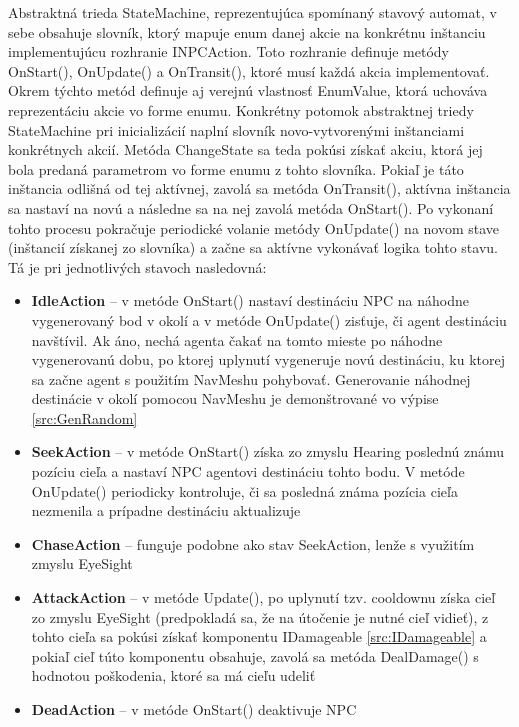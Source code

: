 \documentclass[slovak, master]{diploma}
\begin{document}
Abstraktná trieda StateMachine, reprezentujúca spomínaný stavový automat, v sebe obsahuje slovník, ktorý mapuje enum danej akcie na konkrétnu inštanciu implementujúcu rozhranie INPCAction. Toto rozhranie definuje metódy OnStart(), OnUpdate() a OnTransit(), ktoré musí každá akcia implementovať. Okrem týchto metód definuje aj verejnú vlastnosť EnumValue, ktorá uchováva reprezentáciu akcie vo forme enumu. Konkrétny potomok abstraktnej triedy StateMachine pri inicializácií naplní slovník novo-vytvorenými inštanciami konkrétnych akcií. Metóda ChangeState sa teda pokúsi získať akciu, ktorá jej bola predaná parametrom vo forme enumu z tohto slovníka. Pokiaľ je táto inštancia odlišná od tej aktívnej, zavolá sa metóda OnTransit(), aktívna inštancia sa nastaví na novú a následne sa na nej zavolá metóda OnStart(). Po vykonaní tohto procesu pokračuje periodické volanie metódy OnUpdate() na novom stave (inštancií získanej zo slovníka) a začne sa aktívne vykonávať logika tohto stavu. Tá je pri jednotlivých stavoch nasledovná:
\begin{itemize}
  \item \textbf{IdleAction} -- v metóde OnStart() nastaví destináciu NPC na náhodne vygenerovaný bod v okolí a v metóde OnUpdate() zisťuje, či agent destináciu navštívil. Ak áno, nechá agenta čakať na tomto mieste po náhodne vygenerovanú dobu, po ktorej uplynutí vygeneruje novú destináciu, ku ktorej sa začne agent s použitím NavMeshu pohybovať. Generovanie náhodnej destinácie v okolí pomocou NavMeshu je demonštrované vo výpise \ref{src:GenRandom}
  \item \textbf{SeekAction} -- v metóde OnStart() získa zo zmyslu Hearing poslednú známu pozíciu cieľa a nastaví NPC agentovi destináciu tohto bodu. V metóde OnUpdate() periodicky kontroluje, či sa posledná známa pozícia cieľa nezmenila a prípadne destináciu aktualizuje
  \item \textbf{ChaseAction} -- funguje podobne ako stav SeekAction, lenže s využitím zmyslu EyeSight
  \item \textbf{AttackAction} -- v metóde Update(), po uplynutí tzv. cooldownu získa cieľ zo zmyslu EyeSight (predpokladá sa, že na útočenie je nutné cieľ vidieť), z tohto cieľa sa pokúsi získať komponentu IDamageable \ref{src:IDamageable} a pokiaľ cieľ túto komponentu obsahuje, zavolá sa metóda DealDamage() s hodnotou poškodenia, ktoré sa má cieľu udeliť
  \item \textbf{DeadAction} -- v metóde OnStart() deaktivuje NPC
\end{itemize}
\end{document}
